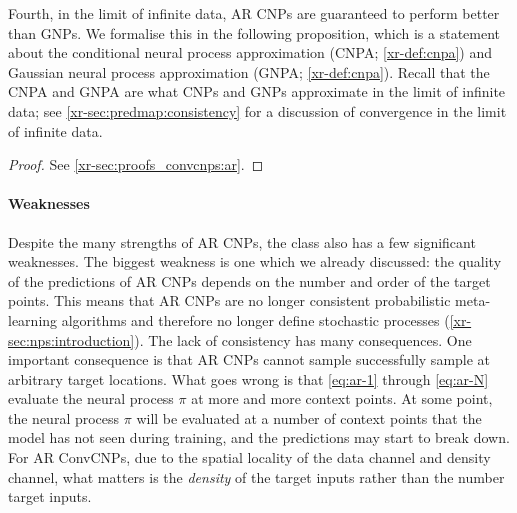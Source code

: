 \documentclass[12pt]{report}
\newcommand{\xrprefix}[1]{xr-#1}
\begin{document}
Fourth, in the limit of infinite data, AR CNPs are guaranteed to perform better than GNPs.
We formalise this in the following proposition, which is a statement about the conditional neural process approximation (CNPA; \cref{\xrprefix{def:cnpa}})
and Gaussian neural process approximation (GNPA; \cref{\xrprefix{def:cnpa}}).
Recall that the CNPA and GNPA are what CNPs and GNPs approximate in the limit of infinite data;
see \cref{\xrprefix{sec:predmap:consistency}} for a discussion of convergence in the limit of infinite data.

\begin{proof}
    See \cref{\xrprefix{sec:proofs_convcnps:ar}}.
\end{proof}

\paragraph{Weaknesses} Despite the many strengths of AR CNPs, 
the class also has a few significant weaknesses.
The biggest weakness is one which we already discussed:
the quality of the predictions of AR CNPs depends on the number and order of the target points.
This means that AR CNPs are no longer consistent probabilistic meta-learning algorithms and therefore no longer define stochastic processes (\cref{\xrprefix{sec:nps:introduction}}).
The lack of consistency has many consequences.
One important consequence is that AR CNPs cannot sample successfully sample at arbitrary target locations.
What goes wrong is that \eqref{eq:ar-1} through \eqref{eq:ar-N} evaluate the neural process $\pi$ at more and more context points.
At some point, the neural process $\pi$ will be evaluated at a number of context points that the model has not seen during training, and the predictions may start to break down.
For AR ConvCNPs, due to the spatial locality of the data channel and density channel, what matters is the \emph{density} of the target inputs rather than the number target inputs.
\end{document}
